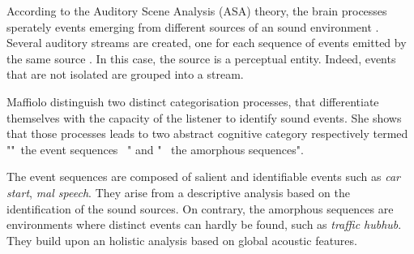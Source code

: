 \documentclass[twoside,twocolumn]{article}
\begin{document}

According to the Auditory Scene Analysis (ASA) theory, the brain processes sperately events emerging from different sources of an sound environment \cite{bregman1994auditory}. Several auditory streams are created, one for each sequence of events emitted by the same source \cite{carlyon2004brain}. In this case, the source is a perceptual entity. Indeed, events that are not isolated are grouped into a stream.


Maffiolo \cite{maffiolo_caracterisation_1999} distinguish two distinct categorisation processes, that differentiate themselves with the capacity of the listener to identify sound events. She shows that those processes leads to two abstract cognitive category respectively termed ""~the event sequences ~" and "~ the amorphous sequences".


The event sequences are composed of salient and identifiable events such as \emph{car start}, \emph{mal speech}. They arise from a descriptive analysis based on the identification of the sound sources. On contrary, the amorphous sequences are environments where distinct events can hardly be found, such as \emph{traffic hubhub}. They build upon an holistic analysis based on global acoustic features.
\end{document}
